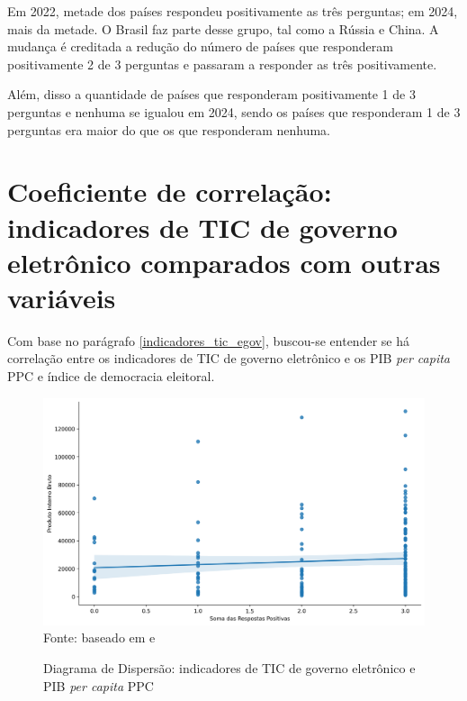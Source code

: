 Em 2022, metade dos países respondeu positivamente as três perguntas; em 2024, mais da metade. O Brasil faz parte desse grupo, tal como a Rússia e China. A mudança é creditada a redução do número de países que responderam positivamente 2 de 3 perguntas e passaram a responder as três positivamente. 

Além, disso a quantidade de países que responderam positivamente 1 de 3 perguntas e nenhuma se igualou em 2024, sendo os países que responderam 1 de 3 perguntas era maior do que os que responderam nenhuma.

\section{Coeficiente de correlação: indicadores de TIC de governo eletrônico comparados com outras variáveis}

Com base no parágrafo \ref{indicadores_tic_egov}, buscou-se entender se há correlação entre os indicadores de TIC de governo eletrônico e os PIB \textit{per capita} PPC e índice de democracia eleitoral.

\begin{figure}[H]
	\centering
	\caption{Diagrama de Dispersão: indicadores de TIC de governo eletrônico e PIB \textit{per capita} PPC}
	\includegraphics[width=1\linewidth]{figuras/ict_in_government/dispersao_ticegov_pib}
	\label{fig:dispersao_ticegov_pib}
	\footnotesize{Fonte: baseado em \cite{WB_pib_per_capita_países} e \cite{ONU_ICT_in_government_indicators}}
\end{figure}

